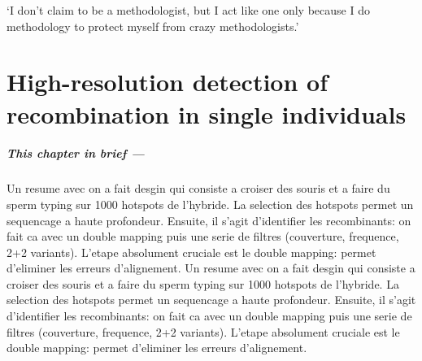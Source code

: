 \begin{savequote}[8cm]
	‘I don't claim to be a methodologist, but I act like one only because I do methodology to protect myself from crazy methodologists.’
	
	
\end{savequote}

\chapter{\label{ch:5-methodology}High-resolution detection of recombination in single individuals}

\minitoc{}

{\small{} \itshape{}

\paragraph{This chapter in brief —}
Un resume avec on a fait desgin qui consiste a croiser des souris et a faire du sperm typing sur 1000 hotspots de l'hybride.
La selection des hotspots permet un sequencage a haute profondeur.
Ensuite, il s'agit d'identifier les recombinants: on fait ca avec un double mapping puis une serie de filtres (couverture, frequence, 2+2 variants).
L'etape absolument cruciale est le double mapping: permet d'eliminer les erreurs d'alignement.
Un resume avec on a fait desgin qui consiste a croiser des souris et a faire du sperm typing sur 1000 hotspots de l'hybride.
La selection des hotspots permet un sequencage a haute profondeur.
Ensuite, il s'agit d'identifier les recombinants: on fait ca avec un double mapping puis une serie de filtres (couverture, frequence, 2+2 variants).
L'etape absolument cruciale est le double mapping: permet d'eliminer les erreurs d'alignement.

}




